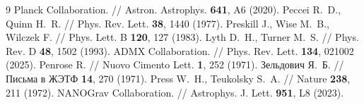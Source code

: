 \documentclass[12pt,a4paper]{article}
\begin{document}
\begin{thebibliography}{9}
 Planck Collaboration. // Astron. Astrophys. \textbf{641}, A6 (2020).
 Peccei R.~D., Quinn H.~R. // Phys. Rev. Lett. \textbf{38}, 1440 (1977).
 Preskill J., Wise M.~B., Wilczek F. // Phys. Lett. B \textbf{120}, 127 (1983).
 Lyth D.~H., Turner M.~S. // Phys. Rev. D \textbf{48}, 1502 (1993).
 ADMX Collaboration. // Phys. Rev. Lett. \textbf{134}, 021002 (2025).
 Penrose R. // Nuovo Cimento Lett. \textbf{1}, 252 (1971).
 Зельдович Я.~Б. // Письма в ЖЭТФ \textbf{14}, 270 (1971).
 Press W.~H., Teukolsky S.~A. // Nature \textbf{238}, 211 (1972).
 NANOGrav Collaboration. // Astrophys. J. Lett. \textbf{951}, L8 (2023).
\end{thebibliography}
\end{document}
